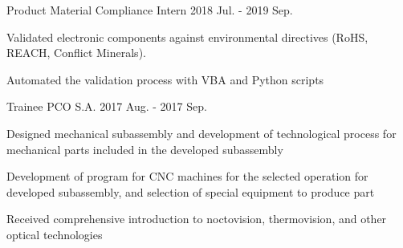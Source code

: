 \begin{cventries}
  \cventry
    {Product Material Compliance Intern} %
    {}
    {}
    {2018 Jul. - 2019 Sep.} %
    {
      \begin{cvitems} %
        \item {Validated electronic components against environmental directives (RoHS, REACH, Conflict Minerals).}
        \item {Automated the validation process with VBA and Python scripts}
      \end{cvitems}
    }

\cventry
{Trainee} %
{PCO S.A.}
{}
{2017 Aug. - 2017 Sep.} %
{
  \begin{cvitems} %
    \item {Designed mechanical subassembly and development of technological process for mechanical parts included in the developed subassembly}
    \item {Development of program for CNC machines for the selected operation for developed subassembly, and selection of special equipment to produce part}
    \item {Received comprehensive introduction to noctovision, thermovision, and other optical technologies}
  \end{cvitems}
}

\end{cventries}
